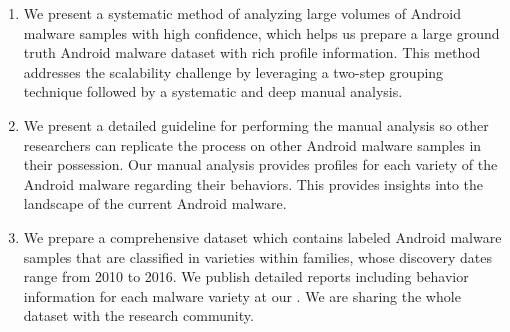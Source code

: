 \begin{enumerate}[label=\textbf{\arabic*}.]
\vspace{-.1in}
\item
We present a systematic method of analyzing large volumes of Android malware samples with high
confidence, which helps us prepare a large ground truth Android malware dataset with rich profile information.
This method addresses the scalability challenge by leveraging a two-step grouping technique
followed by a systematic and deep manual analysis.
\item We present a detailed guideline for performing the manual analysis so other researchers can 
replicate the process on other Android malware samples in their
possession.
Our manual analysis provides profiles for each variety of the Android malware
regarding their behaviors.
This provides insights into the landscape of the current Android malware.
\item We prepare a comprehensive dataset which contains \samsize labeled Android malware samples that are classified in \versize 
varieties within \fsize families, 
whose discovery dates range from 2010 to 2016. 
We publish detailed reports including behavior information for each malware variety at our
\amd \pubsite.
We are sharing the whole dataset with the research community.




\end{enumerate}
